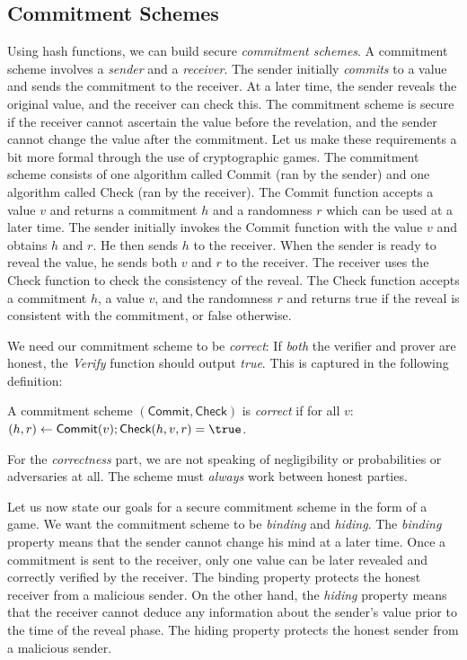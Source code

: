 \subsection*{Commitment Schemes}

Using hash functions, we can build secure \emph{commitment schemes}.
A commitment scheme involves a \emph{sender} and a \emph{receiver}. The sender initially
\emph{commits} to a value and sends the commitment to the receiver. At a later time, the
sender reveals the original value, and the receiver can check this. The commitment scheme
is secure if the receiver cannot ascertain the value before the revelation, and the sender
cannot change the value after the commitment. Let us make these requirements a bit more
formal through the use of cryptographic games.
The commitment scheme consists of one algorithm called \textsf{Commit} (ran by the sender)
and one algorithm called \textsf{Check} (ran by the receiver).
The \textsf{Commit} function accepts a value $v$ and returns a commitment $h$ and a randomness
$r$ which can be used at a later time. The sender initially invokes the \textsf{Commit}
function with the value $v$ and obtains $h$ and $r$. He then sends $h$ to the receiver.
When the sender is ready to reveal the value, he sends both $v$ and $r$ to the receiver.
The receiver uses the \textsf{Check} function to check the consistency of the reveal.
The \textsf{Check} function accepts a commitment $h$, a value $v$,
and the randomness $r$ and returns \textsf{true} if the reveal is consistent with the
commitment, or \textsf{false} otherwise.

We need our commitment
scheme to be \emph{correct}: If \emph{both} the verifier and prover are honest, the \emph{Verify}
function should output \emph{true}. This is captured in the following definition:

\begin{definition}
  A commitment scheme $(\textsf{Commit}, \textsf{Check})$ is \emph{correct} if
  for all $v$:
  $(h, r) \gets \textsf{Commit}(v); \textsf{Check}(h, v, r) = \true$.
\end{definition}

For the \emph{correctness} part, we are not speaking of negligibility or probabilities
or adversaries at all. The scheme must \emph{always} work between honest parties.

Let us now state our goals for
a secure commitment scheme in the form of a game.
We want the commitment scheme to be
\emph{binding} and \emph{hiding}. The \emph{binding} property means that the sender
cannot change his mind at a later time. Once a commitment is sent to the receiver,
only one value can be later revealed and correctly verified by the receiver. The
binding property protects the honest receiver from a malicious sender. On the
other hand, the \emph{hiding} property means that the receiver cannot deduce
any information about the sender's value prior to the time of the reveal phase.
The hiding property protects the honest sender from a malicious sender.

